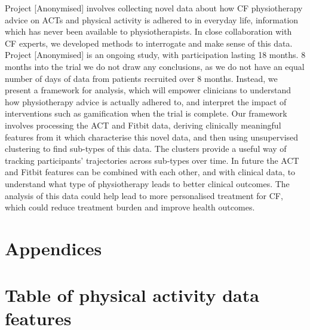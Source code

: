 \documentclass{article}
\begin{document}
Project [Anonymised] involves collecting novel data about how CF physiotherapy advice on ACTs and physical activity is adhered to in everyday life, information which has never been available to physiotherapists.  In close collaboration with CF experts, we developed methods to interrogate and make sense of this data. Project [Anonymised] is an ongoing study, with participation lasting 18 months. 8 months into the trial we do not draw any conclusions, as we do not have an equal number of days of data from patients recruited over 8 months. Instead, we present a framework for analysis, which will empower clinicians to understand how physiotherapy advice is actually adhered to, and interpret the impact of interventions such as gamification when the trial is complete. Our framework involves processing the ACT and Fitbit data, deriving clinically meaningful features from it which characterise this novel data, and then using unsupervised clustering to find sub-types of this data. The clusters provide a useful way of tracking participants' trajectories across sub-types over time. In future the ACT and Fitbit features can be combined with each other, and with clinical data, to understand what type of physiotherapy leads to better clinical outcomes. The analysis of this data could help lead to more personalised treatment for CF, which could reduce treatment burden and improve health outcomes.





\newpage
\section*{Appendices}
\appendix

\section{Table of physical activity data features}
\label{appendix:fitbitfeatures}
\end{document}
